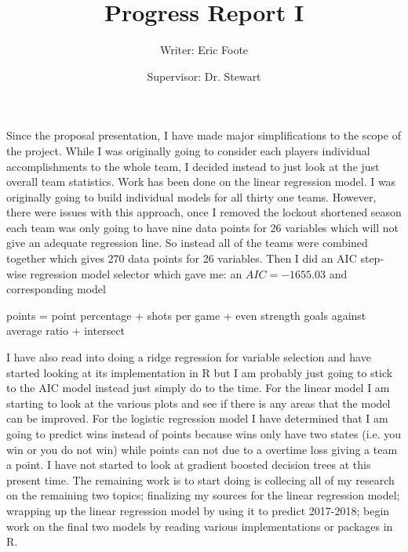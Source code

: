 \documentclass{article}
\begin{document}
	\title{Progress Report I}
	\author{Writer: Eric Foote}
	\maketitle
	\author{Supervisor: Dr. Stewart}
	\newpage
Since the proposal presentation, I have made major simplifications to the scope of the project. While I was originally going to consider each players individual accomplishments to the whole team, I decided instead to just look at the just overall team statistics. Work has been done on the linear regression model. I was originally going to build individual models for all thirty one teams. However, there were issues with this approach, once I removed the lockout shortened season each team was only going to have nine data points for 26 variables which will not give an adequate regression line. So instead all of the teams were combined together which gives 270 data points for 26 variables. Then I did an AIC step-wise regression model selector which gave me: an  $AIC=-1655.03$ and corresponding model 
\begin{center}
	points = point percentage + shots per game + even strength goals against average ratio  + intersect
\end{center}
I have also read into doing a ridge regression for variable selection and have started looking at its implementation in R but I am probably just going to stick to the AIC model instead just simply do to the time. For the linear model I am starting to look at the various plots and see if there is any areas that the model can be improved. For the logistic regression model I have determined that I am going to predict wins instead of points because wins only have two states (i.e. you win or you do not win) while points can not due to a overtime loss giving a team a point. I have not started to look at gradient boosted decision trees at this present time. \newline\newline
The remaining work is to start doing is collecing all of my research on the remaining two topics; finalizing my sources for the linear regression model; wrapping up the linear regression model by using it to predict 2017-2018; begin work on the final two models by reading various implementations or packages in R.    
\end{document}
